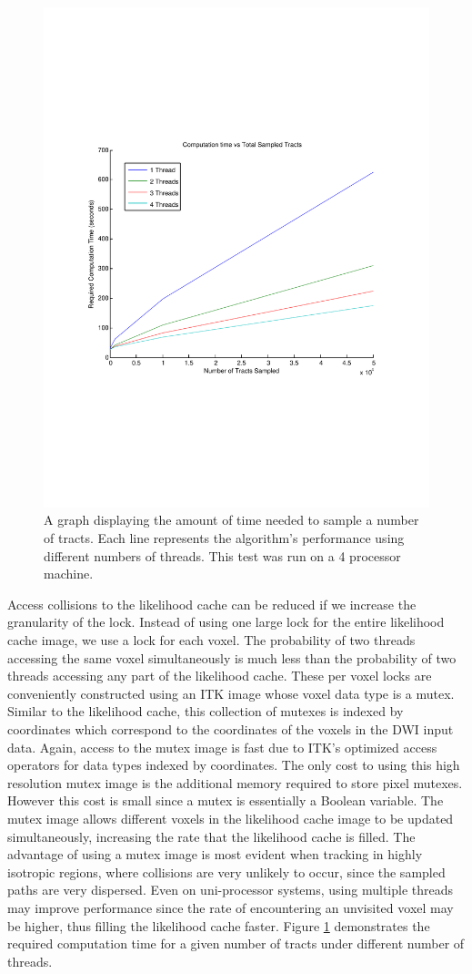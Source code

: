 \begin{figure}
  \center
  \includegraphics[trim = 20mm 70mm 20mm 70mm, clip, width=0.75\linewidth]
	  {timepertracts}
	\caption{A graph displaying the amount of time needed to sample a number of tracts.  Each line represents the algorithm's performance using different numbers of threads.  This test was run on a 4 processor machine.}
	\label{fig:performance}
\end{figure}

Access collisions to the likelihood cache can be reduced if we increase the granularity of the lock.  Instead of using one large lock for the entire likelihood cache image, we use a lock for each voxel.  The probability of two threads accessing the same voxel simultaneously is much less than the probability of two threads accessing any part of the likelihood cache.  These per voxel locks are conveniently constructed using an ITK image whose voxel data type is a mutex.  Similar to the likelihood cache, this collection of mutexes is indexed by coordinates which correspond to the coordinates of the voxels in the DWI input data.  Again, access to the mutex image is fast due to ITK's optimized access operators for data types indexed by coordinates.  The only cost to using this high resolution mutex image is the additional memory required to store pixel mutexes.  However this cost is small since a mutex is essentially a Boolean variable.  The mutex image allows different voxels in the likelihood cache image to be updated simultaneously, increasing the rate that the likelihood cache is filled.  The advantage of using a mutex image is most evident when tracking in highly isotropic regions,  where collisions are very unlikely to occur, since the sampled paths are very dispersed.  Even on uni-processor systems, using multiple threads may improve performance since the rate of encountering an unvisited voxel may be higher, thus filling the likelihood cache faster. Figure \ref{fig:performance} demonstrates the required computation time for a given number of tracts under different number of threads.

